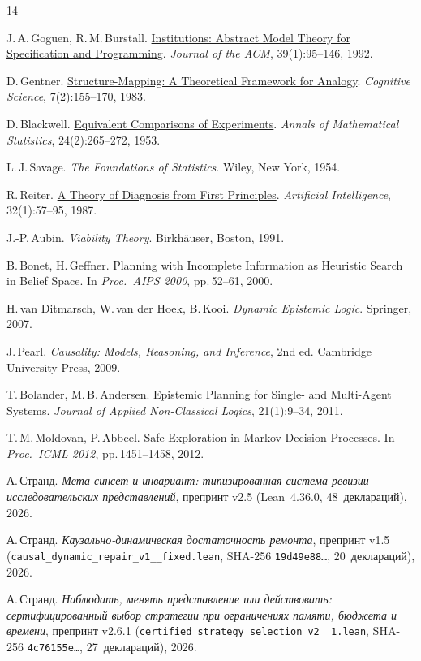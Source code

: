 \documentclass[10pt,a4paper]{article}
\theoremstyle{cleanthm}
\theoremstyle{cleandef}
\begin{document}
\begin{thebibliography}{14}
\small\setlength{\itemsep}{2pt}

J.\,A.\,Goguen, R.\,M.\,Burstall. \href{https://doi.org/10.1145/147508.147524}{Institutions: Abstract Model Theory for Specification and Programming}. \emph{Journal of the ACM}, 39(1):95--146, 1992.

D.\,Gentner. \href{https://doi.org/10.1207/s15516709cog0702_3}{Structure-Mapping: A Theoretical Framework for Analogy}. \emph{Cognitive Science}, 7(2):155--170, 1983.

D.\,Blackwell. \href{https://doi.org/10.1214/aoms/1177729032}{Equivalent Comparisons of Experiments}. \emph{Annals of Mathematical Statistics}, 24(2):265--272, 1953.

L.\,J.\,Savage. \emph{The Foundations of Statistics}. Wiley, New York, 1954.

R.\,Reiter. \href{https://doi.org/10.1016/0004-3702(87)90062-2}{A Theory of Diagnosis from First Principles}. \emph{Artificial Intelligence}, 32(1):57--95, 1987.

J.-P.\,Aubin. \emph{Viability Theory}. Birkh\"auser, Boston, 1991.

B.\,Bonet, H.\,Geffner. Planning with Incomplete Information as Heuristic Search in Belief Space. In \emph{Proc.\ AIPS 2000}, pp.\,52--61, 2000.

H.\,van Ditmarsch, W.\,van der Hoek, B.\,Kooi. \emph{Dynamic Epistemic Logic}. Springer, 2007.

J.\,Pearl. \emph{Causality: Models, Reasoning, and Inference}, 2nd ed. Cambridge University Press, 2009.

T.\,Bolander, M.\,B.\,Andersen. Epistemic Planning for Single- and Multi-Agent Systems. \emph{Journal of Applied Non-Classical Logics}, 21(1):9--34, 2011.

T.\,M.\,Moldovan, P.\,Abbeel. Safe Exploration in Markov Decision Processes. In \emph{Proc.\ ICML 2012}, pp.\,1451--1458, 2012.

А.\,Странд. \emph{Мета-синсет и инвариант: типизированная система ревизии исследовательских представлений}, препринт v2.5 (Lean~4.36.0, 48~деклараций), 2026.

А.\,Странд. \emph{Каузально-динамическая достаточность ремонта}, препринт v1.5 (\texttt{causal\_\allowbreak dynamic\_\allowbreak repair\_\allowbreak v1\_\_\allowbreak fixed.lean}, SHA-256 \texttt{19d49e88\ldots}, 20~деклараций), 2026.

А.\,Странд. \emph{Наблюдать, менять представление или действовать: сертифицированный выбор стратегии при ограничениях памяти, бюджета и времени}, препринт v2.6.1 (\texttt{certified\_\allowbreak strategy\_\allowbreak selection\_\allowbreak v2\_\_\allowbreak 1.lean}, SHA-256 \texttt{4c76155e\ldots}, 27~деклараций), 2026.

\end{thebibliography}
\end{document}
